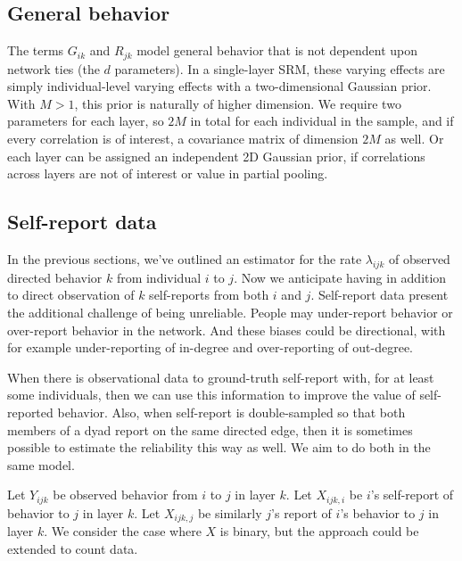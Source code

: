 \documentclass[reqno ,12pt]{amsart}
\begin{document}
\subsection{General behavior}

The terms $G_{ik}$ and $R_{jk}$ model general behavior that is not dependent upon network ties (the $d$ parameters). In a single-layer SRM, these varying effects are simply individual-level varying effects with a two-dimensional Gaussian prior. With $M>1$, this prior is naturally of higher dimension. We require two parameters for each layer, so $2M$ in total for each individual in the sample, and if every correlation is of interest, a covariance matrix of dimension $2M$ as well. Or each layer can be assigned an independent 2D Gaussian prior, if correlations across layers are not of interest or value in partial pooling.

\subsection{Self-report data}

In the previous sections, we've outlined an estimator for the rate $\lambda_{ijk}$ of observed directed behavior $k$ from individual $i$ to $j$. Now we anticipate having in addition to direct observation of $k$ self-reports from both $i$ and $j$. Self-report data present the additional challenge of being unreliable. People may under-report behavior or over-report behavior in the network. And these biases could be directional, with for example under-reporting of in-degree and over-reporting of out-degree.

When there is observational data to ground-truth self-report with, for at least some individuals, then we can use this information to improve the value of self-reported behavior. Also, when self-report is double-sampled so that both members of a dyad report on the same directed edge, then it is sometimes possible to estimate the reliability this way as well. We aim to do both in the same model.

Let $Y_{ijk}$ be observed behavior from $i$ to $j$ in layer $k$. Let $X_{ijk,i}$ be $i$'s self-report of behavior to $j$ in layer $k$. Let $X_{ijk,j}$ be similarly $j$'s report of $i$'s behavior to $j$ in layer $k$. We consider the case where $X$ is binary, but the approach could be extended to count data.
\end{document}
